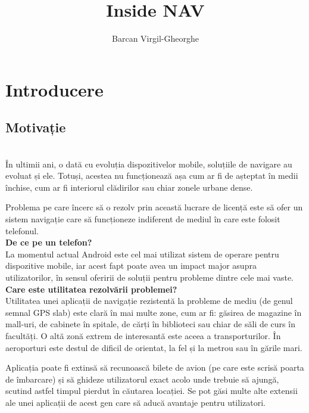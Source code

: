 \documentclass[12pt,a4paper]{article}
\title{Inside NAV}
\author{Barcan Virgil-Gheorghe}
\begin{document}
\maketitle

\newpage
\tableofcontents

\newpage
\section*{Introducere}
\subsection{Motivație}
\\
În ultimii ani, o dată cu evoluția dispozitivelor mobile, soluțiile de navigare au evoluat și ele. Totuși, acestea nu funcționează așa cum ar fi de așteptat în medii închise, cum ar fi interiorul clădirilor sau chiar zonele urbane dense.

Problema pe care încerc să o rezolv prin această lucrare de licență este să ofer un sistem navigație care să funcționeze indiferent de mediul în care este folosit telefonul.\\

\textbf{De ce pe un telefon?}\\
La momentul actual Android este cel mai utilizat sistem de operare pentru dispozitive mobile, iar acest fapt poate avea un impact major asupra utilizatorilor, în sensul oferirii de soluții pentru probleme dintre cele mai vaste.\\

\textbf{Care este utilitatea rezolvării problemei?}\\
Utilitatea unei aplicații de navigație rezistentă la probleme de mediu (de genul semnal GPS slab) este clară în mai multe zone, cum ar fi: găsirea de magazine în mall-uri, de cabinete în spitale, de cărți în biblioteci sau chiar de săli de curs în facultăți. O altă zonă extrem de interesantă este aceea a transporturilor. În aeroporturi este destul de dificil de orientat, la fel și la metrou sau în gările mari. 

Aplicația poate fi extinsă să recunoască bilete de avion (pe care este scrisă poarta de îmbarcare) și să ghideze utilizatorul exact acolo unde trebuie să ajungă, scutind astfel timpul pierdut în căutarea locației. Se pot găsi multe alte extensii ale unei aplicații de acest gen care să aducă avantaje pentru utilizatori.
\end{document}

